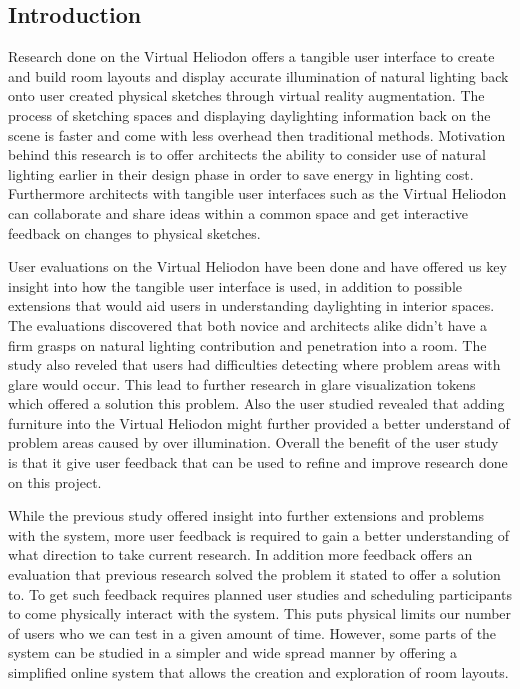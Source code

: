 \documentclass[twoside]{article}
\begin{document}
\begin{multicols}{2} %

\section{Introduction}

Research done on the Virtual Heliodon offers a tangible user interface to create and build
room layouts and display accurate illumination of natural lighting back onto user 
created physical sketches through virtual reality augmentation.
The process of sketching spaces and displaying daylighting information back on the scene is faster
and come with less overhead then traditional methods. 
%
Motivation behind this research is to offer architects the ability to consider use of natural 
lighting earlier in their design phase in order to save energy in lighting cost. 
%
Furthermore architects with tangible user interfaces such as the Virtual Heliodon can collaborate
and share ideas within a common space and get interactive feedback on changes to physical sketches.

User evaluations on the Virtual Heliodon have been done and have offered us key insight into 
how the tangible user interface is used, in addition to possible extensions that would aid
users in understanding daylighting in interior spaces. 
The evaluations discovered that both novice and architects alike didn't have a firm grasps
on natural lighting contribution and penetration into a room.
The study also reveled that  users had difficulties detecting where problem areas with glare would occur.
This lead to further research in glare visualization tokens which offered a solution this problem.
Also the user studied revealed that adding furniture into the Virtual Heliodon might further provided
a better understand of problem areas caused by over illumination.
Overall the benefit of the user study is that it give user feedback that can be used to refine and improve
research done on this project.

While the previous study offered insight into further extensions and problems with the system,
more user feedback is required to gain a better understanding of what direction to take current research.
In addition more feedback offers an evaluation that previous research solved the problem it stated to offer
a solution to.
%
To get such feedback requires planned user studies and scheduling participants to come physically
interact with the system.
This puts physical limits our number of users who we can test in a given amount of time.
%
However, some parts of the system can be studied in a simpler and wide spread manner by offering
a simplified online system that allows the creation and exploration of room layouts.


\end{multicols}
\end{document}
